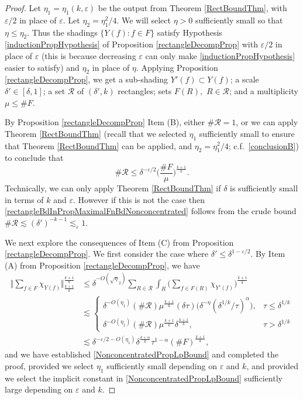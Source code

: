 \documentclass[10pt,a4paper]{amsart}
\newcommand{\eps}{\varepsilon}
\begin{document}
\begin{proof}
Let $\eta_1=\eta_1(k,\eps)$ be the output from Theorem \ref{RectBoundThm}, with $\eps/2$ in place of $\eps$. Let $\eta_2 = \eta_1^2/4$. We will select $\eta>0$ sufficiently small so that $\eta\leq\eta_2$. Thus the shadings $\{Y(f)\colon f\in F\}$ satisfy Hypothesis \eqref{inductionPropHypothesis} of Proposition \ref{rectangleDecompProp} with $\eps/2$ in place of $\eps$ (this is because decreasing $\eps$ can only make \eqref{inductionPropHypothesis} easier to satisfy) and $\eta_2$ in place of $\eta$. Applying Proposition \ref{rectangleDecompProp}, we get a sub-shading $Y'(f)\subset Y(f)$; a scale $\delta'\in [\delta,1]$; a set $\mathcal{R}$ of $(\delta', k)$ rectangles; sets $F(R),$ $R\in\mathcal{R}$; and a multiplicity $\mu\leq\#F$. 


By Proposition \ref{rectangleDecompProp} Item (B), either $\#\mathcal{R}=1$, or we can apply Theorem \ref{RectBoundThm} (recall that we selected $\eta_1$ sufficiently small to ensure that Theorem \ref{RectBoundThm} can be applied, and $\eta_2 = \eta_1^2/4$; c.f.~\eqref{conclusionB}) to conclude that
\begin{equation}\label{rectangleBdInPropMaximalFnBdNonconcentrated}
\# \mathcal{R} \leq \delta^{-\eps/2}  \Big(\frac{\# F}{\mu}\Big)^{\frac{k+1}{k}}.
\end{equation}
Technically, we can only apply Theorem \ref{RectBoundThm} if $\delta$ is sufficiently small in terms of $k$ and $\eps$. However if this is not the case then \eqref{rectangleBdInPropMaximalFnBdNonconcentrated} follows from the crude bound $\# \mathcal{R}\lesssim (\delta')^{-k-1}\lesssim_{\eps}1$.


We next explore the consequences of Item (C) from Proposition \ref{rectangleDecompProp}. We first consider the case where $\delta'\leq\delta^{1-\eps/2}$. By Item (A) from Proposition \ref{rectangleDecompProp}, we have 
\begin{equation}
\begin{split}
\Big \Vert \sum_{f\in F}\chi_{Y(f)}\Big\Vert_{\frac{k+1}{k}}^{\frac{k+1}{k}} 
& \leq \delta^{-O(\sqrt \eta_2)}\sum_{R\in\mathcal{R}} \int_{R}\Big(\sum_{f\in F(R)}\chi_{Y'(f)}\Big)^{\frac{k+1}{k}}\\
& \lesssim \left\{ \begin{array}{ll} \delta^{-O(\eta_1)}(\#\mathcal{R}) \mu^{\frac{k+1}{k}} (\delta\tau)\Big( \delta^{-\eta}(\delta^{1/k}/\tau)^{\alpha}\Big), & \tau\leq\delta^{1/k} \\ \delta^{-O(\eta_1)}(\#\mathcal{R}) \mu^{\frac{k+1}{k}} \delta^{\frac{k+1}{k}}, & \tau>\delta^{1/k} \end{array}\right. \\
& \lesssim\delta^{-\eps/2 -O(\eta_1)}\delta^{\frac{k+\alpha}{k}}\tau^{1-\alpha}  (\#F)^{\frac{k+1}{k}},
\end{split}
\end{equation}
and we have established \eqref{NonconcentratedPropLpBound} and completed the proof, provided we select $\eta_1$ sufficiently small depending on $\eps$ and $k$, and provided we select the implicit constant in \eqref{NonconcentratedPropLpBound} sufficiently large depending on $\eps$ and $k$.


\end{proof}
\end{document}
